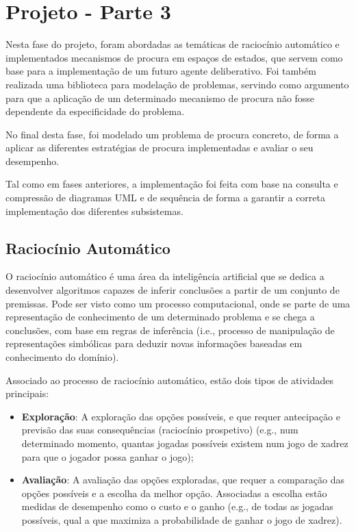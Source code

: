 \chapter{Projeto - Parte 3}\label{ch:projeto-parte3}

Nesta fase do projeto, foram abordadas as temáticas de raciocínio automático e implementados mecanismos de procura em espaços de estados, que servem como base para a implementação de um futuro agente deliberativo.
Foi também realizada uma biblioteca para modelação de problemas, servindo como argumento para que a aplicação de um determinado mecanismo de procura não fosse dependente da especificidade do problema.

No final desta fase, foi modelado um problema de procura concreto, de forma a aplicar as diferentes estratégias de procura implementadas e avaliar o seu desempenho.

Tal como em fases anteriores, a implementação foi feita com base na consulta e compressão de diagramas UML e de sequência de forma a garantir a correta implementação dos diferentes subsistemas.

\section{Raciocínio Automático}\label{sec:raciocinio-automatico}

O raciocínio automático é uma área da inteligência artificial que se dedica a desenvolver algoritmos capazes de inferir conclusões a partir de um conjunto de premissas.
Pode ser visto como um processo computacional, onde se parte de uma representação de conhecimento de um determinado problema e se chega a conclusões, com base em regras de inferência (i.e., processo de manipulação de representações simbólicas para deduzir novas informações baseadas em conhecimento do domínio).

Associado ao processo de raciocínio automático, estão dois tipos de atividades principais:

\begin{itemize}
    \item \textbf{Exploração}: A exploração das opções possíveis, e que requer antecipação e previsão das suas consequências (raciocínio prospetivo) (e.g., num determinado momento, quantas jogadas possíveis existem num jogo de xadrez para que o jogador possa ganhar o jogo);
    \item \textbf{Avaliação}: A avaliação das opções exploradas, que requer a comparação das opções possíveis e a escolha da melhor opção.
    Associadas a escolha estão medidas de desempenho como o custo e o ganho (e.g., de todas as jogadas possíveis, qual a que maximiza a probabilidade de ganhar o jogo de xadrez).
\end{itemize}

